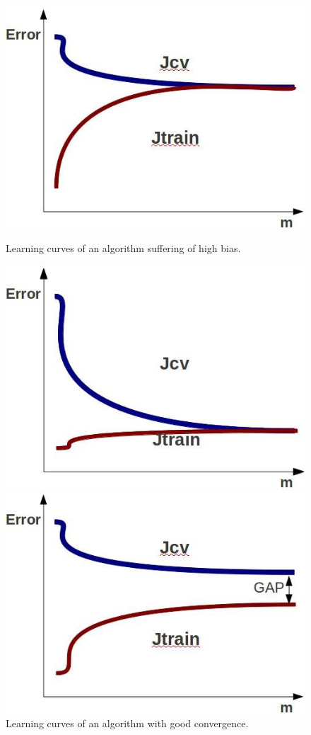 \documentclass[aps,letterpaper,10pt]{revtex4}
\begin{document}
\begin{figure}[]
  \includegraphics[width=\linewidth]{img/learning_curves_high_bias.jpg}
  \caption{Learning curves of an algorithm suffering of high bias.}\label{fig:10}
\endminipage\hfill
{}
  \includegraphics[width=\linewidth]{img/learning_curves_just_fine.jpg}
  \caption{Learning curves of an algorithm with good convergence.}\label{fig:11}
\endminipage\hfill
{}%
  \includegraphics[width=\linewidth]{img/learning_curves_high_variance.jpg}

\end{figure}
\end{document}
